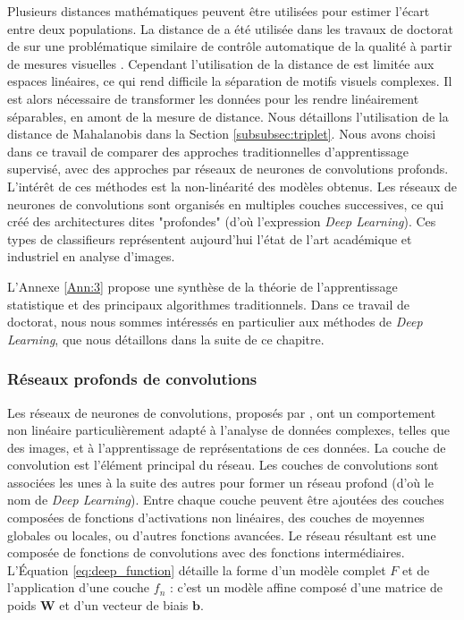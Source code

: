 Plusieurs distances mathématiques peuvent être utilisées pour estimer l'écart entre deux populations.
La distance de \citeauthor{mahalanobis_generalised_1936} \cite{mahalanobis_generalised_1936} a été utilisée dans les travaux de doctorat de \citeauthor{lacombe_exploitation_2018a} sur une problématique similaire de contrôle automatique de la qualité à partir de mesures visuelles \cite{lacombe_exploitation_2018a}.
Cependant l'utilisation de la distance de \citeauthor{mahalanobis_generalised_1936} est limitée aux espaces linéaires, ce qui rend difficile la séparation de motifs visuels complexes.
Il est alors nécessaire de transformer les données pour les rendre linéairement séparables, en amont de la mesure de distance.
Nous détaillons l'utilisation de la distance de Mahalanobis dans la Section \ref{subsubsec:triplet}.
Nous avons choisi dans ce travail de comparer des approches traditionnelles d'apprentissage supervisé, avec des approches par réseaux de neurones de convolutions profonds.
L'intérêt de ces méthodes est la non-linéarité des modèles obtenus.
Les réseaux de neurones de convolutions sont organisés en multiples couches successives, ce qui créé des architectures dites "profondes" (d'où l'expression \textit{Deep Learning}).
Ces types de classifieurs représentent aujourd'hui l'état de l'art académique et industriel en analyse d'images.

L'Annexe \ref{Ann:3} propose une synthèse de la théorie de l'apprentissage statistique et des principaux algorithmes traditionnels.
Dans ce travail de doctorat, nous nous sommes intéressés en particulier aux méthodes de \textit{Deep Learning}, que nous détaillons dans la suite de ce chapitre.

\subsubsection{Réseaux profonds de convolutions} \label{subsubsec:deep_learning}
Les réseaux de neurones de convolutions, proposés par \citeauthor{lecun_backpropagation_1989} \cite{lecun_backpropagation_1989}, ont un comportement non linéaire particulièrement adapté à l'analyse de données complexes, telles que des images, et à l'apprentissage de représentations de ces données.
La couche de convolution est l'élément principal du réseau.
Les couches de convolutions sont associées les unes à la suite des autres pour former un réseau profond (d'où le nom de \textit{Deep Learning}).
Entre chaque couche peuvent être ajoutées des couches composées de fonctions d'activations non linéaires, des couches de moyennes globales ou locales, ou d'autres fonctions avancées.
Le réseau résultant est une composée de fonctions de convolutions avec des fonctions intermédiaires.
L'Équation \ref{eq:deep_function} détaille la forme d'un modèle complet $F$ et de l'application d'une couche $f_n$ : c'est un modèle affine composé d'une matrice de poids $\mathbf{W}$ et d'un vecteur de biais $\mathbf{b}$.

